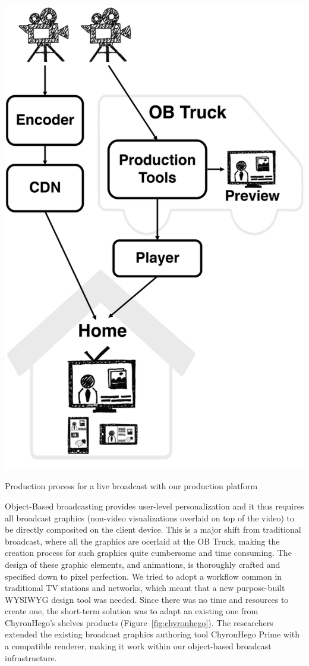 \documentclass[sigchi-a, authorversion]{acmart}
\begin{document}
\begin{marginfigure}
    \includegraphics[width=\marginparwidth]{Figures/process.png}
    \caption{Production process for a live broadcast with our production platform}
    \label{fig:process}
\end{marginfigure}

Object-Based broadcasting provides user-level personalization and it thus
requires all broadcast graphics (non-video visualizations overlaid on top of
the video) to be directly composited on the client device. This is a major shift
from traditional broadcast, where all the graphics are ocerlaid at the OB Truck,
making the creation process for such graphics quite cumbersome and time consuming.
The design of these graphic elements, and animations, is thoroughly crafted and
specified down to pixel perfection. We tried to adopt a workflow common in traditional
TV stations and networks, which meant that a new purpose-built WYSIWYG design
tool was needed. Since there was no time and resources to create one, the
short-term solution was to adapt an existing one from ChyronHego's shelves
products (Figure~\ref{fig:chyronhego}). The researchers extended the existing
broadcast graphics authoring tool ChyronHego Prime with a compatible renderer,
making it work within our object-based broadcast infrastructure.
\end{document}
